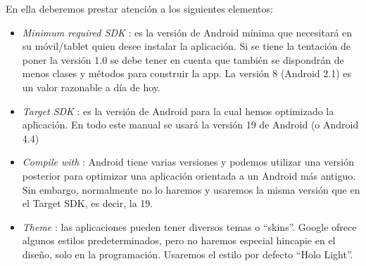 \documentclass[a4paper,12pt,spanish]{sphinxmanual}
\begin{document}
En ella deberemos prestar atención a los siguientes elementos:
\begin{itemize}
\item {} 
\emph{Minimum required SDK} : es la versión de Android mínima que necesitará en su móvil/tablet quien desee instalar la aplicación. Si se tiene la tentación de poner la versión 1.0 se debe tener en cuenta que también se dispondrán de menos clases y métodos para construir la app. La versión 8 (Android 2.1) es un valor razonable a día de hoy.

\item {} 
\emph{Target SDK} : es la versión de Android para la cual hemos optimizado la aplicación. En todo este manual se usará la versión 19 de Android (o Android 4.4)

\item {} 
\emph{Compile with} : Android tiene varias versiones y podemos utilizar una versión posterior para optimizar una aplicación orientada a un Android más antiguo. Sin embargo, normalmente no lo haremos y usaremos la misma versión que en el Target SDK, es decir, la 19.

\item {} 
\emph{Theme} : las aplicaciones pueden tener diversos temas o ``skins''. Google ofrece algunos estilos predeterminados, pero no haremos especial hincapie en el diseño, solo en la programación. Usaremos el estilo por defecto ``Holo Light''.

\end{itemize}
\end{document}
